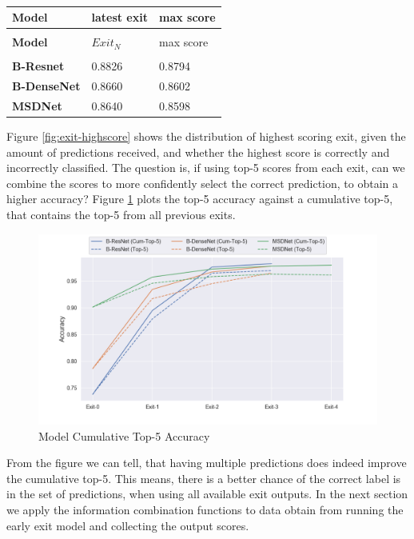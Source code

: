 \begin{minipage}[t]{\linewidth}
\begin{longtabu}{>{\bfseries}X|X|X}
	\caption[]{} \label{tbl:latest-vs-max} \\
	\toprule
	\rowfont{\bfseries}
	Model & latest exit & max score   \tabularnewline
	\bottomrule
	\endfirsthead
	\\
	\toprule
	\rowfont{\bfseries}
	Model & $Exit_N$ & max score    \tabularnewline
	\bottomrule
	\endhead %
	\bottomrule
	\\
	\endfoot
	\hline
	\endlastfoot
	B-Resnet	& 0.8826	& 0.8794  \tabularnewline
	\hline
	B-DenseNet	& 0.8660 	& 0.8602 \tabularnewline
	\hline
	MSDNet		& 0.8640 	& 0.8598 \tabularnewline							
	\bottomrule
\end{longtabu}
\end{minipage}

Figure \ref{fig:exit-highscore} shows the distribution of highest scoring exit, given the amount of predictions received, and whether the highest score is correctly and incorrectly classified. The question is, if using top-5 scores from each exit, can we combine the scores to more confidently select the correct prediction, to obtain a higher accuracy? Figure \ref{fig:top-5-cumulative} plots the top-5 accuracy against a cumulative top-5, that contains the top-5 from all previous exits. 

\begin{figure}
	\centering
	\includegraphics[width=.8\linewidth]{figures/edge/top5cumulative}
	\caption[Top-5 Cumulative]{Model Cumulative Top-5 Accuracy}
	\label{fig:top-5-cumulative}
\end{figure}

From the figure we can tell, that having multiple predictions does indeed improve the cumulative top-5. This means, there is a better chance of the correct label is in the set of predictions, when using all available exit outputs. In the next section we apply the information combination functions to data obtain from running the early exit model and collecting the output scores. 

